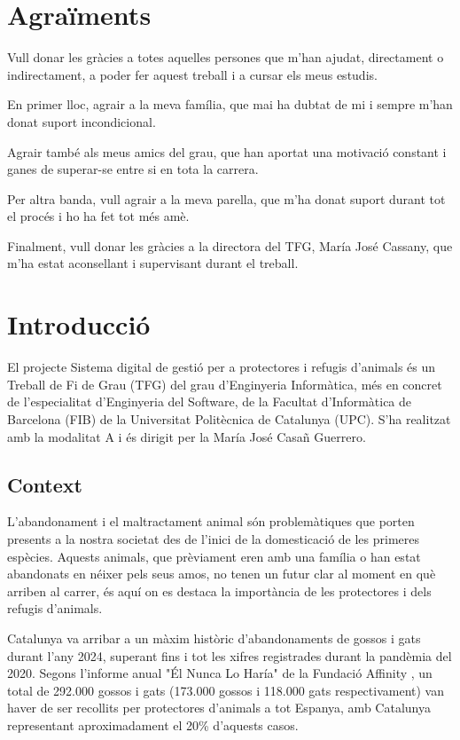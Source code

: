 \documentclass[11pt,a4paper]{report}
\newcommand{\titolTFG}{Sistema digital de gestió per a protectores i refugis d'animals
}
\begin{document}
\section*{Agraïments}
Vull donar les gràcies a totes aquelles persones que m'han ajudat, directament o indirectament, a poder fer aquest treball i a cursar els meus estudis.

En primer lloc, agrair a la meva família, que mai ha dubtat de mi i sempre m'han donat suport incondicional.

Agrair també als meus amics del grau, que han aportat una motivació constant i ganes de superar-se entre si en tota la carrera.

Per altra banda, vull agrair a la meva parella, que m'ha donat suport durant tot el procés i ho ha fet tot més amè.

Finalment, vull donar les gràcies a la directora del TFG, María José Cassany, que m'ha estat aconsellant i supervisant durant el treball.
\newpage
\captionsetup[figure]{font=it}
\tableofcontents
\newpage
\listoffigures
\newpage
\listoftables
\newpage
\lstlistoflistings
\newpage
\section{Introducció}
El projecte \titolTFG és un Treball de Fi de Grau (TFG) del grau d'Enginyeria Informàtica, més en concret de l’especialitat d’Enginyeria del Software, de la Facultat d’Informàtica de Barcelona (FIB) de la Universitat Politècnica de Catalunya (UPC). S’ha realitzat amb la modalitat A i és dirigit per la María José Casañ Guerrero.

\subsection{Context} \label{sec:context}
L’abandonament i el maltractament animal són problemàtiques que porten presents a la nostra societat des de l’inici de la domesticació de les primeres espècies. Aquests animals, que prèviament eren amb una família o han estat abandonats en néixer pels seus amos, no tenen un futur clar al moment en què arriben al carrer, és aquí on es destaca la importància de les protectores i dels refugis d’animals.

Catalunya va arribar a un màxim històric d'abandonaments de gossos i gats durant l'any 2024, superant fins i tot les xifres registrades durant la pandèmia del 2020. Segons l'informe anual "Él Nunca Lo Haría" de la Fundació Affinity \cite{fundacion_affinity_inicio_nodate}, un total de 292.000 gossos i gats (173.000 gossos i 118.000 gats respectivament) van haver de ser recollits per protectores d'animals a tot Espanya, amb Catalunya representant aproximadament el 20\% d'aquests casos.
\end{document}
